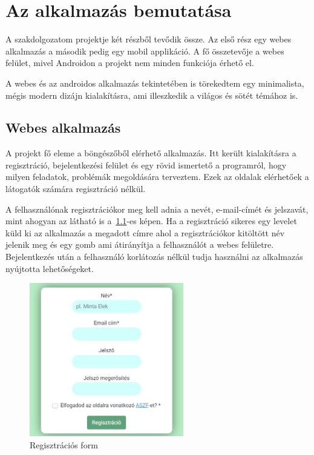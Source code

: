 \documentclass[
]{thesis-ekf}
\theoremstyle{definition}
\theoremstyle{remark}
\begin{document}
	\chapter{Az alkalmazás bemutatása}
	A szakdolgozatom projektje két részből tevődik össze. Az első rész egy webes alkalmazás a második pedig egy mobil applikáció. A fő összetevője a webes felület, mivel Androidon a projekt nem minden funkciója érhető el. 
	
	A webes és az androidos alkalmazás tekintetében is törekedtem egy minimalista, mégis modern dizájn kialakításra, ami illeszkedik a világos és sötét témához is.
	
	\section{Webes alkalmazás}
	A projekt fő eleme a böngészőből elérhető alkalmazás. Itt került kialakításra a regisztráció, bejelentkezési felület és egy rövid ismertető a programról, hogy milyen feladatok, problémák megoldására terveztem. Ezek az oldalak elérhetőek a látogatók számára regisztráció nélkül.	
		
	A felhasználónak regisztrációkor meg kell adnia a nevét, e-mail-címét és jelszavát, mint ahogyan az látható is a~\ref{figure:webapp_register}-es képen. Ha a regisztráció sikeres egy levelet küld ki az alkalmazás a megadott címre ahol a regisztrációkor kitöltött név jelenik meg és egy gomb ami átirányítja a felhasználót a webes felületre. Bejelentkezés után a felhasználó korlátozás nélkül tudja használni az alkalmazás nyújtotta lehetőségeket. 
	
	\begin{figure}[ht!]
		\centering
		\includegraphics[width=0.6\textwidth]{web_app/web_register}
		\caption{Regisztrációs form}
		\label{figure:webapp_register}
	\end{figure}
	
\end{document}
